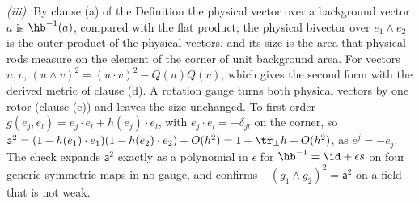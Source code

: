 \emph{(iii).} By clause (a) of the Definition the physical vector over a background vector $a$ is $\hb^{-1}(a)$, compared with the flat product; the physical bivector over $e_{1} \wedge e_{2}$ is the outer product of the physical vectors, and its size is the area that physical rods measure on the element of the corner of unit background area. For vectors $u, v$, $(u \wedge v)^{2} = (u \cdot v)^{2} - Q(u)Q(v)$, which gives the second form with the derived metric of clause (d). A rotation gauge turns both physical vectors by one rotor (clause (e)) and leaves the size unchanged. To first order $g(e_{j}, e_{l}) = e_{j} \cdot e_{l} + h(e_{j}) \cdot e_{l}$, with $e_{j} \cdot e_{l} = -\delta_{jl}$ on the corner, so $\mathsf{a}^{2} = (1 - h(e_{1}) \cdot e_{1})(1 - h(e_{2}) \cdot e_{2}) + O(h^{2}) = 1 + \tr_{\perp}h + O(h^{2})$, as $e^{j} = -e_{j}$. The check expands $\mathsf{a}^{2}$ exactly as a polynomial in $\epsilon$ for $\hb^{-1} = \id + \epsilon s$ on four generic symmetric maps in no gauge, and confirms $-(g_{1} \wedge g_{2})^{2} = \mathsf{a}^{2}$ on a field that is not weak.

